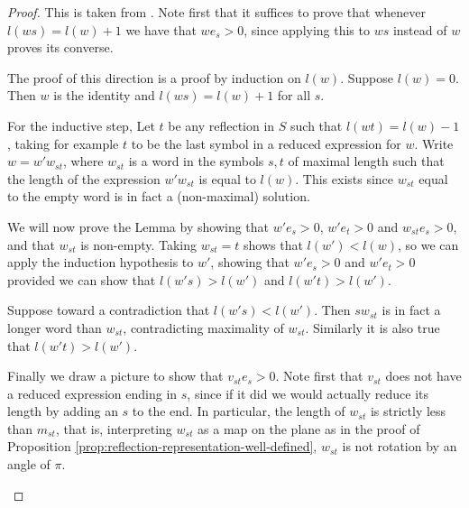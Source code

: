 \documentclass{article}
\theoremstyle{definition}
\begin{document}
\begin{proof}
This is taken from \cite{humphreys1990}. Note first that it suffices to prove that whenever $l(ws) = l(w) + 1$ we have that $we_s > 0$, since applying this to $ws$ instead of $w$ proves its converse. 

The proof of this direction is a proof by induction on $l(w)$. Suppose $l(w) = 0$. Then $w$ is the identity and $l(ws) = l(w) + 1$ for all $s$. 

For the inductive step, Let $t$ be any reflection in $S$ such that $l(wt) = l(w) - 1$, taking for example $t$ to be the last symbol in a reduced expression for $w$. Write $w = w'w_{st}$, where $w_{st}$ is a word in the symbols $s, t$ of maximal length such that the length of the expression $w'w_{st}$ is equal to $l(w)$. This exists since $w_{st}$ equal to the empty word is in fact a (non-maximal) solution.

We will now prove the Lemma by showing that $w'e_s > 0$, $w'e_t > 0$ and $w_{st}e_s > 0$, and that $w_{st}$ is non-empty. Taking $w_{st} = t$ shows that $l(w') < l(w)$, so we can apply the induction hypothesis to $w'$, showing that $w'e_s > 0$ and $w'e_t > 0$ provided we can show that $l(w's) > l(w')$ and $l(w't) > l(w')$. 

Suppose toward a contradiction that $l(w's) < l(w')$. Then $sw_{st}$ is in fact a longer word than $w_{st}$, contradicting maximality of $w_{st}$. Similarly it is also true that $l(w't) > l(w')$.

Finally we draw a picture to show that $v_{st}e_s > 0$. Note first that $v_{st}$ does not have a reduced expression ending in $s$, since if it did we would actually reduce its length by adding an $s$ to the end. In particular, the length of $w_{st}$ is strictly less than $m_{st}$, that is, interpreting $w_{st}$ as a map on the plane as in the proof of Proposition \ref{prop:reflection-representation-well-defined}, $w_{st}$ is not rotation by an angle of $\pi$. 

\begin{figure}
\centering
\begin{minipage}{.5\textwidth}
\centering
{}
\end{minipage}
\end{figure}
\end{proof}
\end{document}
